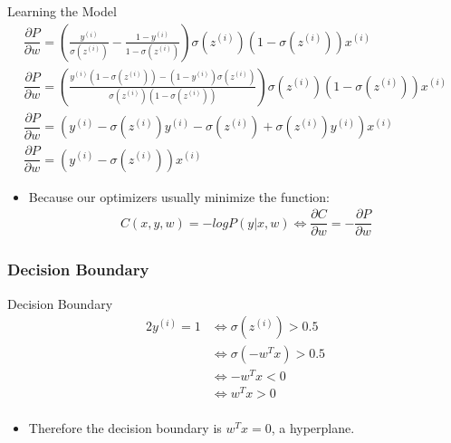 \begin{frame}{Learning the Model}
\begin{gather*}
	\dfrac{\partial P}{\partial w} = \left(\frac{y^{(i)}}{\sigma(z^{(i)})} - \frac{1-y^{(i)}}{1-\sigma(z^{(i)})}\right) \sigma(z^{(i)})(1-\sigma(z^{(i)}))x^{(i)}\\
	\dfrac{\partial P}{\partial w} = \left( \frac{y^{(i)}(1-\sigma(z^{(i)})) - (1-y^{(i)})\sigma(z^{(i)})}{\sigma(z^{(i)})(1-\sigma(z^{(i)}))} \right) \sigma(z^{(i)})(1-\sigma(z^{(i)}))x^{(i)}\\
	\dfrac{\partial P}{\partial w} = \left(y^{(i)} - \sigma(z^{(i)})y^{(i)} - \sigma(z^{(i)}) + \sigma(z^{(i)})y^{(i)}\right) x^{(i)} \\
	\dfrac{\partial P}{\partial w} = \left(y^{(i)} - \sigma(z^{(i)})\right)x^{(i)}
\end{gather*}
\begin{itemize}
	\item Because our optimizers usually minimize the function:
	      \begin{gather*}
	      	C(x,y,w) = -logP(y|x,w) \Leftrightarrow \dfrac{\partial C}{\partial w} = -\dfrac{\partial P}{\partial w}
	      \end{gather*}
\end{itemize}
\end{frame}

\subsubsection{Decision Boundary}
\begin{frame}{Decision Boundary}
\begin{alignat*}{2}
	y^{(i)} = 1 & \Leftrightarrow \sigma(z^{(i)}) > 0.5 \\
	            & \Leftrightarrow \sigma(-w^Tx) > 0.5   \\
	            & \Leftrightarrow -w^Tx < 0             \\
	            & \Leftrightarrow w^Tx > 0              \\
\end{alignat*}
\begin{itemize}
	\item Therefore the decision boundary is $w^Tx = 0$, a hyperplane.
\end{itemize}
\end{frame}

